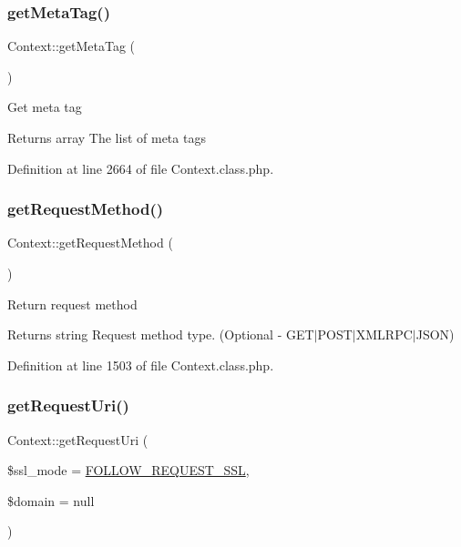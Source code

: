 \subsubsection{\texorpdfstring{get\+Meta\+Tag()}{getMetaTag()}}
{\footnotesize\ttfamily Context\+::get\+Meta\+Tag (\begin{DoxyParamCaption}{ }\end{DoxyParamCaption})}

Get meta tag \begin{DoxyReturn}{Returns}
array The list of meta tags 
\end{DoxyReturn}


Definition at line 2664 of file Context.\+class.\+php.

\hypertarget{classContext_a6912ff86e08ef782a296b77ff1307481}{}\label{classContext_a6912ff86e08ef782a296b77ff1307481} 
\subsubsection{\texorpdfstring{get\+Request\+Method()}{getRequestMethod()}}
{\footnotesize\ttfamily Context\+::get\+Request\+Method (\begin{DoxyParamCaption}{ }\end{DoxyParamCaption})}

Return request method \begin{DoxyReturn}{Returns}
string Request method type. (Optional -\/ G\+E\+T$\vert$\+P\+O\+S\+T$\vert$\+X\+M\+L\+R\+P\+C$\vert$\+J\+S\+ON) 
\end{DoxyReturn}


Definition at line 1503 of file Context.\+class.\+php.

\hypertarget{classContext_aa79578cfccee4d7f7c4890dc6e36ff90}{}\label{classContext_aa79578cfccee4d7f7c4890dc6e36ff90} 
\subsubsection{\texorpdfstring{get\+Request\+Uri()}{getRequestUri()}}
{\footnotesize\ttfamily Context\+::get\+Request\+Uri (\begin{DoxyParamCaption}\item[{}]{\$ssl\+\_\+mode = {\ttfamily \hyperlink{Context_8class_8php_a546ef85538017b41b2928e818066989d}{F\+O\+L\+L\+O\+W\+\_\+\+R\+E\+Q\+U\+E\+S\+T\+\_\+\+S\+SL}},  }\item[{}]{\$domain = {\ttfamily null} }\end{DoxyParamCaption})}

